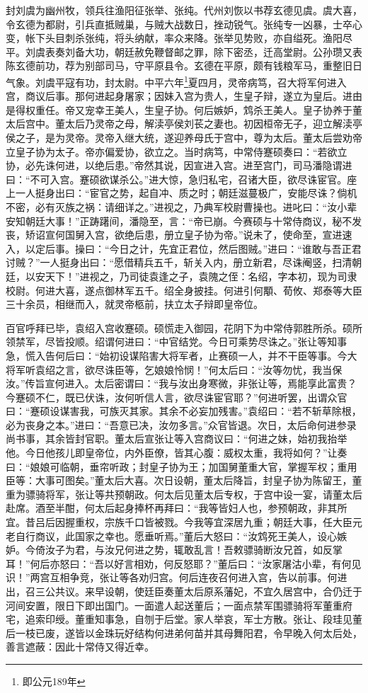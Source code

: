 \documentclass[a4paper]{article}
\begin{document}
封刘虞为幽州牧，领兵往渔阳征张举、张纯。代州刘恢以书荐玄德见虞。虞大喜，令玄德为都尉，引兵直抵贼巢，与贼大战数日，挫动锐气。张纯专一凶暴，士卒心变，帐下头目刺杀张纯，将头纳献，率众来降。张举见势败，亦自缢死。渔阳尽平。刘虞表奏刘备大功，朝廷赦免鞭督邮之罪，除下密丞，迁高堂尉。公孙瓒又表陈玄德前功，荐为别部司马，守平原县令。玄德在平原，颇有钱粮军马，重整旧日气象。刘虞平寇有功，封太尉。中平六年\footnote[3]{{即公元189年}}夏四月，灵帝病笃，召大将军何进入宫，商议后事。那何进起身屠家；因妹入宫为贵人，生皇子辩，遂立为皇后。进由是得权重任。帝又宠幸王美人，生皇子协。何后嫉妒，鸩杀王美人。皇子协养于董太后宫中。董太后乃灵帝之母，解渎亭侯刘苌之妻也。初因桓帝无子，迎立解渎亭侯之子，是为灵帝。灵帝入继大统，遂迎养母氏于宫中，尊为太后。董太后尝劝帝立皇子协为太子。帝亦偏爱协，欲立之。当时病笃，中常侍蹇硕奏曰：“若欲立协，必先诛何进，以绝后患。”帝然其说，因宣进入宫。进至宫门，司马潘隐谓进曰：“不可入宫。蹇硕欲谋杀公。”进大惊，急归私宅，召诸大臣，欲尽诛宦官。座上一人挺身出曰：“宦官之势，起自冲、质之时；朝廷滋蔓极广，安能尽诛？倘机不密，必有灭族之祸：请细详之。”进视之，乃典军校尉曹操也。进叱曰：“汝小辈安知朝廷大事！”正踌躇间，潘隐至，言：“帝已崩。今赛硕与十常侍商议，秘不发丧，矫诏宣何国舅入宫，欲绝后患，册立皇子协为帝。”说未了，使命至，宣进速入，以定后事。操曰：“今日之计，先宜正君位，然后图贼。”进曰：“谁敢与吾正君讨贼？”一人挺身出曰：“愿借精兵五千，斩关入内，册立新君，尽诛阉竖，扫清朝廷，以安天下！”进视之，乃司徒袁逢之子，袁隗之侄：名绍，字本初，现为司隶校尉。何进大喜，遂点御林军五千。绍全身披挂。何进引何顒、荀攸、郑泰等大臣三十余员，相继而入，就灵帝柩前，扶立太子辩即皇帝位。

百官呼拜已毕，袁绍入宫收蹇硕。硕慌走入御园，花阴下为中常侍郭胜所杀。硕所领禁军，尽皆投顺。绍谓何进曰：“中官结党。今日可乘势尽诛之。”张让等知事急，慌入告何后曰：“始初设谋陷害大将军者，止赛硕一人，并不干臣等事。今大将军听袁绍之言，欲尽诛臣等，乞娘娘怜悯！”何太后曰：“汝等勿忧，我当保汝。”传旨宣何进入。太后密谓曰：“我与汝出身寒微，非张让等，焉能享此富贵？今蹇硕不仁，既已伏诛，汝何听信人言，欲尽诛宦官耶？”何进听罢，出谓众官曰：“蹇硕设谋害我，可族灭其家。其余不必妄加残害。”袁绍曰：“若不斩草除根，必为丧身之本。”进曰：“吾意已决，汝勿多言。”众官皆退。次日，太后命何进参录尚书事，其余皆封官职。董太后宣张让等入宫商议曰：“何进之妹，始初我抬举他。今日他孩儿即皇帝位，内外臣僚，皆其心腹：威权太重，我将如何？”让奏曰：“娘娘可临朝，垂帘听政；封皇子协为王；加国舅董重大官，掌握军权；重用臣等：大事可图矣。”董太后大喜。次日设朝，董太后降旨，封皇子协为陈留王，董重为骠骑将军，张让等共预朝政。何太后见董太后专权，于宫中设一宴，请董太后赴席。酒至半酣，何太后起身捧杯再拜曰：“我等皆妇人也，参预朝政，非其所宜。昔吕后因握重权，宗族千口皆被戮。今我等宜深居九重；朝廷大事，任大臣元老自行商议，此国家之幸也。愿垂听焉。”董后大怒曰：“汝鸩死王美人，设心嫉妒。今倚汝子为君，与汝兄何进之势，辄敢乱言！吾敕骠骑断汝兄首，如反掌耳！”何后亦怒曰：“吾以好言相劝，何反怒耶？”董后曰：“汝家屠沽小辈，有何见识！”两宫互相争竞，张让等各劝归宫。何后连夜召何进入宫，告以前事。何进出，召三公共议。来早设朝，使廷臣奏董太后原系藩妃，不宜久居宫中，合仍迁于河间安置，限日下即出国门。一面遣人起送董后；一面点禁军围骠骑将军董重府宅，追索印绶。董重知事急，自刎于后堂。家人举哀，军士方散。张让、段珪见董后一枝已废，遂皆以金珠玩好结构何进弟何苗并其母舞阳君，令早晚入何太后处，善言遮蔽：因此十常侍又得近幸。
\end{document}
